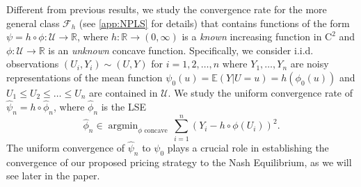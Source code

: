 \documentclass{article} %
\begin{document}

Different from previous results, we study the convergence rate for the more general class $\mathcal{F}_h$ (see \cref{app:NPLS} for details) that contains functions of the form $\psi = h \circ \phi: \mathcal{U} \to \mathbb{R}$, where $h:\mathbb{R}\rightarrow (0,\infty)$ is a \emph{known} increasing function in $\mathrm{C}^2$ and $\phi:\mathcal{U} \rightarrow \mathbb{R}$ is an \emph{unknown} concave function. Specifically, we consider i.i.d. observations $(U_i,Y_i)\sim (U,Y)$ for $i=1,2,\dots,n$ where $Y_1,\dots,Y_n$ are noisy representations of the mean function $\psi_0(u)=\mathbb{E}\left(Y|U=u\right) = h(\phi_0(u))$ and $U_1 \leq U_2 \leq \dots \leq U_n$ are contained in $\mathcal{U}$. We study the uniform convergence rate of $\widehat{\psi}_n  = h \circ \widehat{\phi}_n$, where $\widehat{\phi}_n$ is the LSE
$$
\textstyle  \widehat{\phi}_n \in \operatorname{argmin}_{\phi \text{ concave}} \, \sum_{i=1}^n\left(Y_i- h \circ \phi \left(U_i\right)\right)^2.
$$
The uniform convergence of $\widehat{\psi}_n$ to $\psi_0$ plays a crucial role in establishing the convergence of our proposed pricing strategy to the Nash Equilibrium, as we will see later in the paper.
\end{document}
